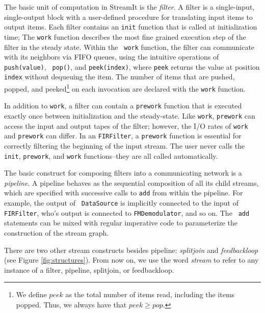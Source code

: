 The basic unit of computation in StreamIt is the {\it filter}.  A
filter is a single-input, single-output block with a user-defined
procedure for translating input items to output items.  
Each filter contains an {\tt init}
function that is called at initialization time; 
The {\tt work} function describes the most fine grained
execution step of the filter in the steady state.  Within the {\tt
work} function, the filter can communicate with its neighbors via FIFO
queues, using the intuitive operations of {\tt push(value)}, {\tt
pop()}, and {\tt peek(index)}, where {\tt peek} returns the value at
position {\tt index} without dequeuing the item.  The number of items
that are pushed, popped, and peeked\footnote{We define $peek$ as the
total number of items read, including the items popped.  Thus, we
always have that $peek \ge pop$.} on each invocation are declared with
the {\tt work} function.

In addition to {\tt work}, a filter can contain a {\tt prework}
function that is executed exactly once between initialization and the
steady-state.  Like {\tt work}, {\tt prework} can access the input and
output tapes of the filter; however, the I/O rates of {\tt work} and
{\tt prework} can differ.  In an {\tt FIRFilter}, a {\tt prework}
function is essential for correctly filtering the beginning of the
input stream.  The user never calls the {\tt init}, {\tt prework}, and
{\tt work} functions--they are all called automatically.


The basic construct for composing filters into a communicating network
is a {\it pipeline}.%
A pipeline behaves as the sequential composition
of all its child streams, which are specified with successive calls to
{\tt add} from within the pipeline.  For example, the output of {\tt
DataSource} is implicitly connected to the input of {\tt FIRFilter},
who's output is connected to {\tt FMDemodulator}, and so on.  The {\tt
add} statements can be mixed with regular imperative code to
parameterize the construction of the stream graph.

There are two other stream constructs besides pipeline: {\it
splitjoin} and {\it feedbackloop} (see Figure \ref{fig:structures}).
From now on, we use the word {\it stream} to refer to any instance of
a filter, pipeline, splitjoin, or feedbackloop.

